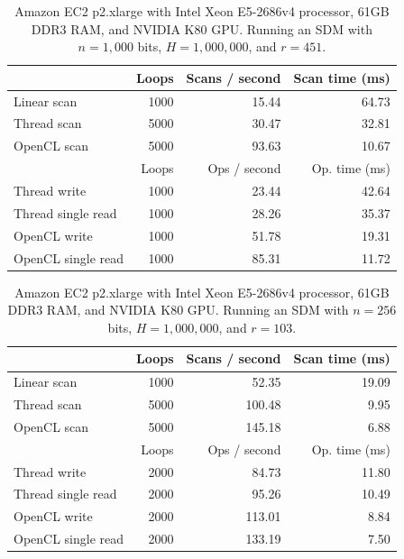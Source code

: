 \begin{table}[!htb]
\centering
\begin{tabular}{| l | r | r | r |}
    \hline
    & Loops & Scans / second & Scan time (ms) \\ \hline
    Linear scan & 1000 & 15.44 & 64.73 \\
    Thread scan & 5000 & 30.47 & 32.81 \\
    OpenCL scan & 5000 & 93.63 & 10.67 \\ \hline
    \hline
    & Loops & Ops / second & Op. time (ms) \\ \hline
    Thread write & 1000 & 23.44 & 42.64 \\
    Thread single read & 1000 & 28.26 & 35.37 \\
    OpenCL write & 1000 & 51.78 & 19.31 \\
    OpenCL single read & 1000 & 85.31 & 11.72 \\
    \hline
\end{tabular}
\caption{Amazon EC2 p2.xlarge with Intel Xeon E5-2686v4 processor, 61GB DDR3 RAM, and NVIDIA K80 GPU. Running an SDM with $n=1,000$ bits, $H=1,000,000$, and $r=451$.}
\end{table}


\begin{table}[!htb]
\centering
\begin{tabular}{| l | r | r | r |}
    \hline
    & Loops & Scans / second & Scan time (ms) \\ \hline
    Linear scan & 1000 & 52.35 & 19.09 \\
    Thread scan & 5000 & 100.48 & 9.95 \\
    OpenCL scan & 5000 & 145.18 & 6.88 \\ \hline
    \hline
    & Loops & Ops / second & Op. time (ms) \\ \hline
    Thread write & 2000 & 84.73 & 11.80 \\
    Thread single read & 2000 & 95.26 & 10.49 \\
    OpenCL write & 2000 & 113.01 & 8.84 \\
    OpenCL single read & 2000 & 133.19 & 7.50 \\
    \hline
\end{tabular}
\caption{Amazon EC2 p2.xlarge with Intel Xeon E5-2686v4 processor, 61GB DDR3 RAM, and NVIDIA K80 GPU. Running an SDM with $n=256$ bits, $H=1,000,000$, and $r=103$.}
\end{table}

